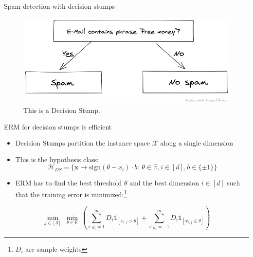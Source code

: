 \begin{frame}{Spam detection with decision stumps}
    \begin{figure}
        \centering
        \includegraphics[width=\textwidth]{img/spam_classifier.png}
        \caption{This is a Decision Stump.}
    \end{figure}
\end{frame}

\begin{frame}{ERM for decision stumps is efficient}
    \begin{itemize} \pause
        \item Decision Stumps partition the instance space $\mathcal{X}$
            along a single dimension \pause
        \item This is the hypothesis class: \pause
    \begin{equation*}
        \mathcal{H}_{DS} = \{ \mathbf{x} \mapsto \text{sign}\left( \theta - x_i \right) \cdot b: \ 
        \theta \in \mathbb{R}, i \in \left[ d \right], b \in \{ \pm 1 \} \}
    \end{equation*} \pause
        \item ERM has to find the best threshold $\theta$ and the best
            dimension $i \in [d]$ such that
            the training error is minimized:\footnote{$D_i$ are sample weights} \pause
    \end{itemize}
    \begin{equation*}
        \min_{j \in \left[ d \right]} \  \min_{\theta \in \mathbb{R}} \ 
        \left( \sum_{i: y_i=1}^m D_i \mathds{1}_{\left[ x_{i, j} > \theta \right]} + 
            \sum_{i: y_i=-1}^m D_i \mathds{1}_{\left[ x_{i, j} \leq \theta \right]} \right)
    \end{equation*} \pause
    \centering
\end{frame}

